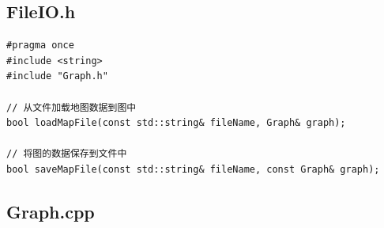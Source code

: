 \documentclass[UTF8,12pt,a4paper]{ctexart}
\begin{document}
\subsection{FileIO.h}

\begin{lstlisting}[caption={FileIO.h 源码}]
#pragma once
#include <string>
#include "Graph.h"

// 从文件加载地图数据到图中
bool loadMapFile(const std::string& fileName, Graph& graph);

// 将图的数据保存到文件中
bool saveMapFile(const std::string& fileName, const Graph& graph);

\end{lstlisting}

\subsection{Graph.cpp}
\end{document}
